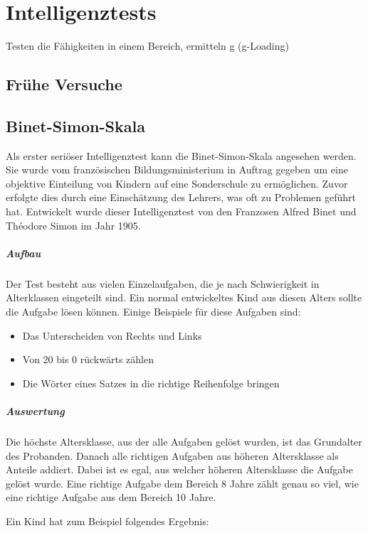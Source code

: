 \chapter{Intelligenztests}
Testen die Fähigkeiten in einem Bereich, ermitteln g (g-Loading)
\section{Frühe Versuche}
\section{Binet-Simon-Skala}
Als erster \glqq seriöser\grqq{} Intelligenztest kann die Binet-Simon-Skala angesehen werden. Sie wurde vom französischen Bildungsministerium in Auftrag gegeben um eine objektive Einteilung von Kindern auf eine Sonderschule zu ermöglichen. Zuvor erfolgte dies durch eine Einschätzung des Lehrers, was oft zu Problemen geführt hat. Entwickelt wurde dieser Intelligenztest von den Franzosen Alfred Binet und Théodore Simon im Jahr 1905.

\paragraph{Aufbau}
Der Test besteht aus vielen Einzelaufgaben, die je nach Schwierigkeit in Alterklassen eingeteilt sind. Ein normal entwickeltes Kind aus diesen Alters sollte die Aufgabe lösen können. Einige Beispiele für diese Aufgaben sind:
\begin{itemize}
  \item{Das Unterscheiden von Rechts und Links}
  \item{Von 20 bis 0 rückwärts zählen}
  \item{Die Wörter eines Satzes in die richtige Reihenfolge bringen}
\end{itemize}

\paragraph{Auswertung}
Die höchste Altersklasse, aus der alle Aufgaben gelöst wurden, ist das Grundalter des Probanden.
Danach alle richtigen Aufgaben aus höheren Altersklasse als Anteile addiert. Dabei ist es egal, aus welcher höheren Altersklasse die Aufgabe gelöst wurde. Eine richtige Aufgabe dem Bereich 8 Jahre zählt genau so viel, wie eine richtige Aufgabe aus dem Bereich 10 Jahre.

Ein Kind hat zum Beispiel folgendes Ergebnis:

